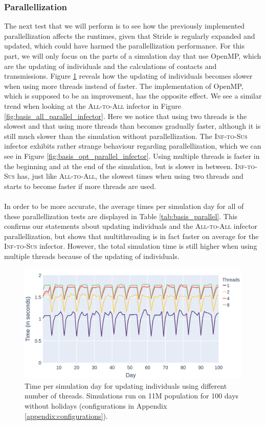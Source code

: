 \subsubsection{Parallellization}
The next test that we will perform is to see how the previously implemented parallellization affects the runtimes, given that Stride is regularly expanded and updated, which could have harmed the parallellization performance. For this part, we will only focus on the parts of a simulation day that use OpenMP, which are the updating of individuals and the calculations of contacts and transmissions. Figure \ref{fig:basis_parallel_updating} reveals how the updating of individuals becomes slower when using more threads instead of faster. The implementation of OpenMP, which is supposed to be an improvement, has the opposite effect. We see a similar trend when looking at the \textsc{All-to-All} infector in Figure \ref{fig:basis_all_parallel_infector}. Here we notice that using two threads is the slowest and that using more threads than becomes gradually faster, although it is still much slower than the simulation without parallellization. The \textsc{Inf-to-Sus} infector exhibits rather strange behaviour regarding parallellization, which we can see in Figure \ref{fig:basis_opt_parallel_infector}. Using multiple threads is faster in the beginning and at the end of the simulation, but is slower in between. \textsc{Inf-to-Sus} has, just like \textsc{All-to-All}, the slowest times when using two threads and starts to become faster if more threads are used.
\\\\
In order to be more accurate, the average times per simulation day for all of these parallellization tests are displayed in Table \ref{tab:basis_parallel}. This confirms our statements about updating individuals and the \textsc{All-to-All} infector parallellization, but shows that multithreading is in fact faster on average for the \textsc{Inf-to-Sus} infector. However, the total simulation time is still higher when using multiple threads because of the updating of individuals.

\begin{figure}
    \centering
    \includegraphics[width=\linewidth]{3 - Stride/fig/basis_parallel_updating.png}
    \caption{Time per simulation day for updating individuals using different number of threads. Simulations run on 11M population for 100 days without holidays (configurations in Appendix \ref{appendix:configurations}).}
    \label{fig:basis_parallel_updating}
\end{figure}

